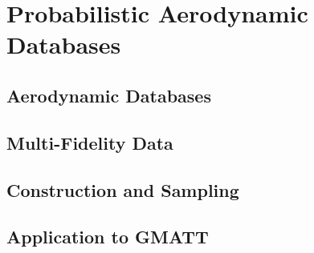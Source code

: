 \chapter{Probabilistic Aerodynamic Databases}

\section{Aerodynamic Databases}

\section{Multi-Fidelity Data}

\section{Construction and Sampling}

\section{Application to GMATT}
